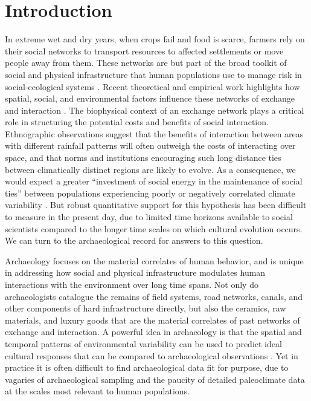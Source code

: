 \documentclass[10pt]{iopart}
\begin{document}
\section*{Introduction}
In extreme wet and dry years, when crops fail and food is scarce, farmers rely on their social networks to transport resources to affected settlements or move people away from them. These networks are but part of the broad toolkit of social and physical infrastructure that human populations use to manage risk in social-ecological systems \parencite{Anderies2015}. Recent theoretical and empirical work highlights how spatial, social, and environmental factors influence these networks of exchange and interaction \parencite{Nolin2010,Koster2014,Hao2015a,Schnegg2015,Freeman2014,udry}. The biophysical context of an exchange network plays a critical role in structuring the potential costs and benefits of social interaction. Ethnographic observations suggest that the benefits of interaction between areas with different rainfall patterns will often outweigh the costs of interacting over space, and that norms and institutions encouraging such long distance ties between climatically distinct regions are likely to evolve. As a consequence, we would expect a greater ``investment of social energy in the maintenance of social ties'' between populations experiencing poorly or negatively correlated climate variability \parencite{Rautman1993a}. But robust quantitative support for this hypothesis has been difficult to measure in the present day, due to limited time horizons available to social scientists compared to the longer time scales on which cultural evolution occurs. We can turn to the archaeological record for answers to this question. 

Archaeology focuses on the material correlates of human behavior, and is unique in addressing how social and physical infrastructure modulates human interactions with the environment over long time spans. Not only do archaeologists catalogue the remains of field systems, road networks, canals, and other components of hard infrastructure directly, but also the ceramics, raw materials, and luxury goods that are the material correlates of past networks of exchange and interaction. A powerful idea in archaeology is that the spatial and temporal patterns of environmental variability can be used to predict ideal cultural responses that can be compared to archaeological observations \parencite{Halstead1989}. Yet in practice it is often difficult to find archaeological data fit for purpose, due to vagaries of archaeological sampling and the paucity of detailed paleoclimate data at the scales most relevant to human populations. 
\end{document}
